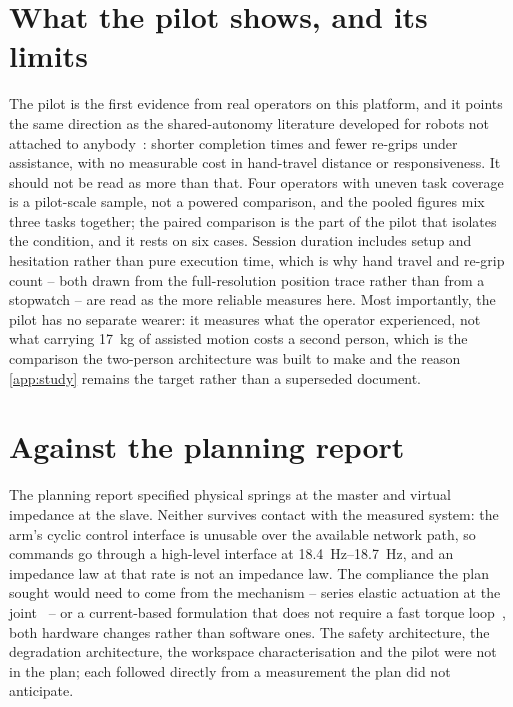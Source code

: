 \section{What the pilot shows, and its limits}
\label{sec:pilot-limits}

The pilot is the first evidence from real operators on this platform, and it
points the same direction as the shared-autonomy literature developed for
robots not attached to anybody~\cite{dragan2013policyblending,javdani2015hindsight}:
shorter completion times and fewer re-grips under assistance, with no
measurable cost in hand-travel distance or responsiveness. It should not be
read as more than that. Four operators with uneven task coverage is a
pilot-scale sample, not a powered comparison, and the pooled figures mix
three tasks together; the paired comparison is the part of the pilot that
isolates the condition, and it rests on six cases. Session duration includes
setup and hesitation rather than pure execution time, which is why hand
travel and re-grip count -- both drawn from the full-resolution position
trace rather than from a stopwatch -- are read as the more reliable measures
here. Most importantly, the pilot has no separate wearer: it measures what
the operator experienced, not what carrying \SI{17}{\kilo\gram} of assisted
motion costs a second person, which is the comparison the two-person
architecture was built to make and the reason \cref{app:study} remains the
target rather than a superseded document.

\section{Against the planning report}

The planning report specified physical springs at the master and virtual
impedance at the slave. Neither survives contact with the measured system:
the arm's cyclic control interface is unusable over the available network
path, so commands go through a high-level interface at
\SIrange{18.4}{18.7}{\hertz}, and an impedance law at that rate is not an
impedance law. The compliance the plan sought would need to come from the
mechanism -- series elastic actuation at the joint~\cite{toubar2022sea,lee2019sea}
-- or a current-based formulation that does not require a fast torque
loop~\cite{dewolde2024impedance}, both hardware changes rather than software
ones. The safety architecture, the degradation architecture, the workspace
characterisation and the pilot were not in the plan; each followed directly
from a measurement the plan did not anticipate.
